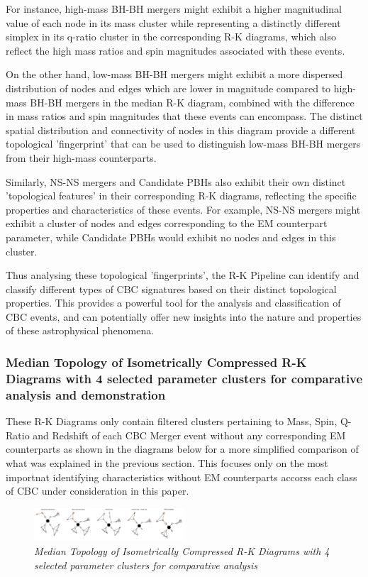 For instance, high-mass BH-BH mergers might exhibit a higher magnitudinal value of each node in its mass cluster while representing a distinctly different simplex in its q-ratio cluster in the corresponding R-K diagrams, which also reflect the high mass ratios and spin magnitudes associated with these events. 

On the other hand, low-mass BH-BH mergers might exhibit a more dispersed distribution of nodes and edges which are lower in magnitude compared to high-mass BH-BH mergers in the median R-K diagram, combined with the difference in  mass ratios and spin magnitudes that these events can encompass. The distinct spatial distribution and connectivity of nodes in this diagram provide a different topological 'fingerprint' that can be used to distinguish low-mass BH-BH mergers from their high-mass counterparts.

Similarly, NS-NS mergers and Candidate PBHs also exhibit their own distinct 'topological features' in their corresponding R-K diagrams, reflecting the specific properties and characteristics of these events. For example, NS-NS mergers might exhibit a cluster of nodes and edges corresponding to the EM counterpart parameter, while Candidate PBHs would exhibit no nodes and edges in this cluster.

Thus analysing these topological 'fingerprints', the R-K Pipeline can identify and classify different types of CBC signatures based on their distinct topological properties. This provides a powerful tool for the analysis and classification of CBC events, and can potentially offer new insights into the nature and properties of these astrophysical phenomena.

 \subsubsection{Median Topology of Isometrically Compressed R-K Diagrams with 4 selected parameter clusters for comparative analysis and demonstration}
 
 These R-K Diagrams only contain filtered clusters pertaining to Mass, Spin, Q-Ratio and Redshift of each CBC Merger event without any corresponding EM counterparts as shown in the diagrams below for a more simplified comparison of what was explained in the previous section. This focuses only on the most importnat identifying characteristics without EM counterparts accorss each class of CBC under consideration in this paper.


\begin{figure}[H]
 	\centering
        \includegraphics[width=0.5\textwidth]{images/Median_Topology_of_Compressed_RK-Diagrams.jpg}
	\caption{\textit{Median Topology of  Isometrically Compressed R-K Diagrams with 4 selected parameter clusters for comparative analysis}}
	\label{fig:Median_Topo_Compressed}
\end{figure}

